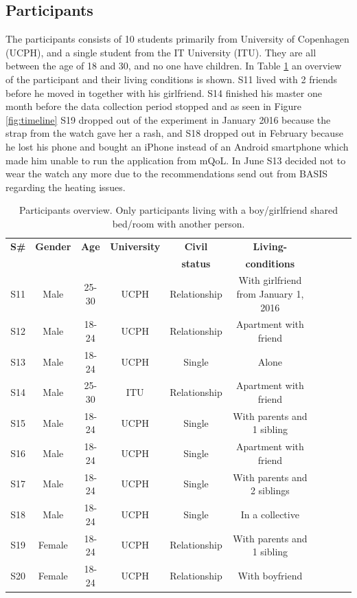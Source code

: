 \documentclass[12pt]{article} %
\begin{document}
\subsection{Participants} \label{sec:participants}
The participants consists of 10 students primarily from University of Copenhagen (UCPH), and a single student from the IT University (ITU). They are all between the age of 18 and 30, and no one have children. In Table \ref{tab:partOv} an overview of the participant and their living conditions is shown. S11 lived with 2 friends before he moved in together with his girlfriend. S14 finished his master one month before the data collection period stopped and as seen in Figure \ref{fig:timeline} S19 dropped out of the experiment in January 2016 because the strap from the watch gave her a rash, and S18 dropped out in February because he lost his phone and bought an iPhone instead of an Android smartphone which made him unable to run the application from mQoL. In June S13 decided not to wear the watch any more due to the recommendations send out from BASIS regarding the heating issues. 

\begin{table}[H]
\center
\begin{footnotesize}
	\begin{tabular}{| c | c | c | c | c | c | c | c | c | c |}
	\hline
	\textbf{S\#} & \textbf{Gender} & \textbf{Age} & \textbf{University} & \textbf{Civil} & \textbf{Living-}\\
	 & \textbf{} & \textbf{} & \textbf{} & \textbf{status} & \textbf{conditions} \\
	
	\hline
	S11 & Male & 25-30 & UCPH & Relationship & With girlfriend from January 1, 2016 \\
	\hline
	S12 & Male & 18-24 & UCPH & Relationship & Apartment with friend\\
	\hline
	S13 & Male & 18-24 & UCPH & Single & Alone \\
	\hline
	S14 & Male & 25-30 & ITU & Relationship & Apartment with friend \\
	\hline
	S15 & Male & 18-24 & UCPH & Single & With parents  and 1 sibling\\
	\hline
	S16 & Male & 18-24 & UCPH & Single & Apartment with friend\\
	\hline
	S17 & Male & 18-24 & UCPH & Single & With parents and 2 siblings \\
	\hline
	S18 & Male & 18-24 & UCPH & Single & In a collective\\
	\hline
	S19 & Female & 18-24 & UCPH & Relationship & With parents and 1 sibling\\
	\hline
	S20 & Female & 18-24 & UCPH & Relationship & With boyfriend\\
	\hline
	\end{tabular}
	\caption{Participants overview. Only participants living with a boy/girlfriend shared bed/room with another person.}
	\label{tab:partOv}
\end{footnotesize}
\end{table}
\end{document}
